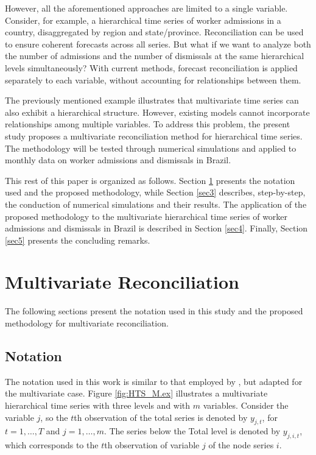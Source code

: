 \documentclass[a4paper,preprint,11pt,authoryear]{elsarticle}
\begin{document}
However, all the aforementioned approaches are limited to a single variable. Consider, for example, a hierarchical time series of worker admissions in a country, disaggregated by region and state/province. Reconciliation can be used to ensure coherent forecasts across all series. But what if we want to analyze both the number of admissions and the number of dismissals at the same hierarchical levels simultaneously? With current methods, forecast reconciliation is applied separately to each variable, without accounting for relationships between them.

The previously mentioned example illustrates that multivariate time series can also exhibit a hierarchical structure. However, existing models cannot incorporate relationships among multiple variables. To address this problem, the present study proposes a multivariate reconciliation method for hierarchical time series. The methodology will be tested through numerical simulations and applied to monthly data on worker admissions and dismissals in Brazil.

This rest of this paper is organized as follows. Section \ref{sec2} presents the notation used and the proposed methodology, while Section \ref{sec3} describes, step-by-step, the conduction of numerical simulations and their results. The application of the proposed methodology to the multivariate hierarchical time series of worker admissions and dismissals in Brazil is described in Section \ref{sec4}. Finally, Section \ref{sec5} presents the concluding remarks.

\section{Multivariate Reconciliation}
\label{sec2}

The following sections present the notation used in this study and the proposed methodology for multivariate reconciliation.

\subsection{Notation}
\label{Notação}

The notation used in this work is similar to that employed by \citet{athanasopoulos2023forecast}, but adapted for the multivariate case. Figure \ref{fig:HTS_M.ex} illustrates a multivariate hierarchical time series with three levels and with $m$ variables. Consider the variable $j$, so the $t$th observation of the total series is denoted by $y_{j,t}$, for $t = 1,\dots, T$ and $j = 1,\dots, m$. The series below the Total level is denoted by $y_{j,i,t}$, which corresponds to the $t$th observation of variable $j$ of the node series $i$.
\end{document}
